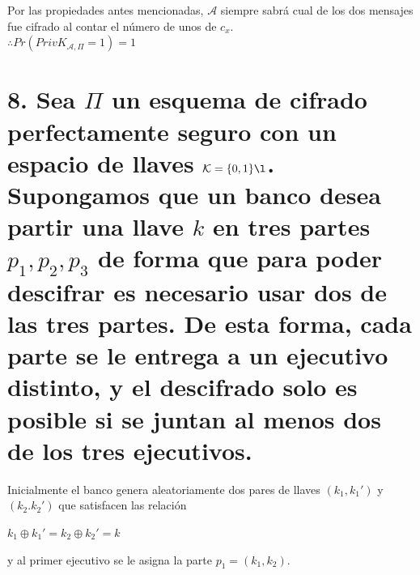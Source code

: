 \documentclass[11pt]{article}
\begin{document}
        Por las propiedades antes mencionadas, $ \mathcal{A} $ siempre sabrá cual de los dos mensajes fue cifrado al contar el número de unos de $ c_{x} $.\\
        
        $ \therefore Pr(PrivK_{\mathcal{A}, \Pi} = 1) = 1 $ 
        
        
        
        \section*{8. Sea $\Pi$ un esquema de cifrado perfectamente seguro con un espacio de llaves $\mathcal{K} = \{0,1\}\l$. Supongamos que un banco desea partir una llave $k$ en tres partes $p_1 , p_2 , p_3$ de forma que para poder descifrar es necesario usar dos de las tres partes. De esta forma, cada parte se le entrega a un ejecutivo distinto, y el descifrado solo es posible si se juntan al menos dos de los tres ejecutivos.}
        
        
        Inicialmente el banco genera aleatoriamente dos pares de llaves $(k_1, k_{1}')$ y $(k_2.k_{2}')$ que satisfacen las relación
        \begin{center}
            $k_1 \oplus k_{1}' = k_2 \oplus k_{2}' = k$
        \end{center}
        
        y al primer ejecutivo se le asigna la parte $p_1 = (k_1 , k_2)$.
        
\end{document}
